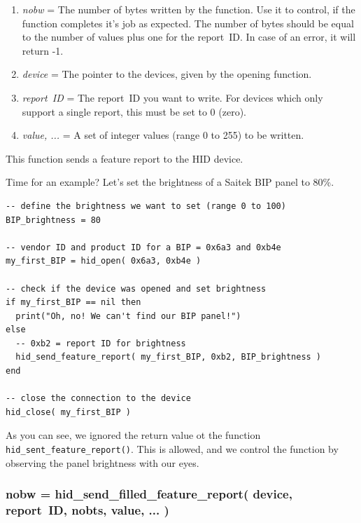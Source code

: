 \documentclass[11pt,parskip=half,a4paper]{scrartcl}
\begin{document}
\begin{enumerate}
\item \emph{nobw} = The number of bytes written by the function. Use it to control, if the function completes it's job as expected. The number of bytes should be equal to the number of values plus one for the report~ID. In case of an error, it will return -1.
\item \emph{device} = The pointer to the devices, given by the opening function.
\item \emph{report~ID} = The report~ID you want to write. For devices which only support a single report, this must be set to 0 (zero).
\item \emph{value, ...} = A set of integer values (range 0 to 255) to be written.
\end{enumerate}

This function sends a feature report to the HID device.

Time for an example? Let's set the brightness of a Saitek BIP panel to 80\%.

\begin{lstlisting}[firstnumber=1]
-- define the brightness we want to set (range 0 to 100)
BIP_brightness = 80

-- vendor ID and product ID for a BIP = 0x6a3 and 0xb4e
my_first_BIP = hid_open( 0x6a3, 0xb4e )

-- check if the device was opened and set brightness
if my_first_BIP == nil then
  print("Oh, no! We can't find our BIP panel!")
else
  -- 0xb2 = report ID for brightness
  hid_send_feature_report( my_first_BIP, 0xb2, BIP_brightness )
end

-- close the connection to the device
hid_close( my_first_BIP )
\end{lstlisting}

As you can see, we ignored the return value ot the function \verb|hid_sent_feature_report()|. This is allowed, and we control the function by observing the panel brightness with our eyes.

\subsubsection{nobw = hid\_send\_filled\_feature\_report( device, report~ID, nobts, value, ... )}
\end{document}
